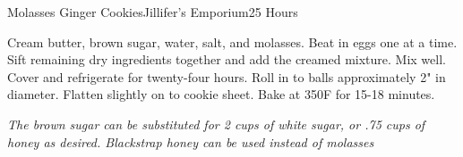 \begin{recipe}{Molasses Ginger Cookies}{Jillifer's Emporium}{25 Hours}

  Cream butter, brown sugar, water, salt, and molasses. Beat in eggs one at a
  time. Sift remaining dry ingredients together and add the creamed
  mixture. Mix well. Cover and refrigerate for twenty-four hours. Roll in to
  balls approximately 2" in diameter. Flatten slightly on to cookie
  sheet. Bake at 350\0F for 15-18 minutes.
\end{recipe}
\textit{The brown sugar can be substituted for 2 cups of white sugar, or .75
  cups of honey as desired. Blackstrap honey can be used instead of molasses}
